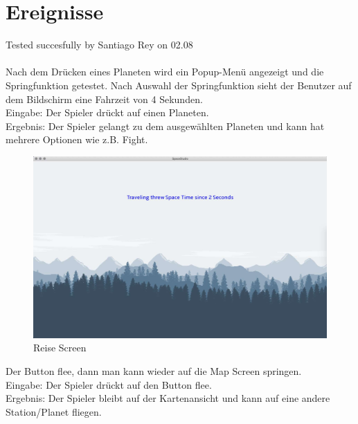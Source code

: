 \documentclass[12pt]{article}
\begin{document}
\section{Ereignisse}
Tested succesfully by Santiago Rey on 02.08\\\\
Nach dem Drücken eines Planeten wird ein Popup-Menü angezeigt und die Springfunktion getestet. Nach Auswahl der Springfunktion sieht der Benutzer auf dem Bildschirm eine Fahrzeit von 4 Sekunden.\\
Eingabe: Der Spieler drückt auf einen Planeten.\\
Ergebnis: Der Spieler gelangt zu dem ausgewählten Planeten und kann hat mehrere Optionen wie z.B. Fight.
\begin{figure}[htp]
\centering
\includegraphics[scale=0.4]{TestProtocolBilder/traveling.jpg}
\caption{Reise Screen}
\end{figure}
\clearpage
Der Button flee, dann man kann wieder auf die Map Screen springen.\\
Eingabe: Der Spieler drückt auf den Button flee.\\
Ergebnis: Der Spieler bleibt auf der Kartenansicht und kann auf eine andere Station/Planet fliegen.\\
\newpage
\end{document}
